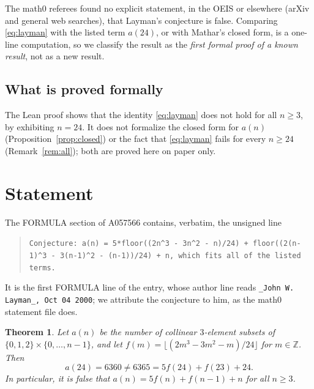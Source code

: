 \documentclass[11pt]{amsart}
\theoremstyle{plain}
\newtheorem{theorem}{Theorem}
\theoremstyle{definition}
\newcommand{\Z}{\mathbb{Z}}
\begin{document}
The math0 referees found no explicit statement, in the OEIS or elsewhere (arXiv and general web searches), that Layman's conjecture is false. Comparing \eqref{eq:layman} with the listed term $a(24)$, or with Mathar's closed form, is a one-line computation, so we classify the result as the \emph{first formal proof of a known result}, not as a new result.

\subsection*{What is proved formally}
The Lean proof shows that the identity \eqref{eq:layman} does not hold for all $n\ge3$, by exhibiting $n=24$. It does not formalize the closed form for $a(n)$ (Proposition~\ref{prop:closed}) or the fact that \eqref{eq:layman} fails for every $n\ge24$ (Remark~\ref{rem:all}); both are proved here on paper only.

\section{Statement}\label{sec:statement}

The FORMULA section of A057566 \cite{A057566} contains, verbatim, the unsigned line
\begin{quote}
{\small\raggedright\texttt{Conjecture: a(n) = 5*floor((2n\^{}3 - 3n\^{}2 - n)/24) + floor((2(n-1)\^{}3 - 3(n-1)\^{}2 - (n-1))/24) + n, which fits all of the listed terms.}\par}
\end{quote}
It is the first FORMULA line of the entry, whose author line reads \texttt{\_John W. Layman\_, Oct 04 2000}; we attribute the conjecture to him, as the math0 statement file does.

\begin{theorem}\label{thm:main}
Let $a(n)$ be the number of collinear $3$-element subsets of $\{0,1,2\}\times\{0,\dots,n-1\}$, and let $f(m)=\lfloor(2m^3-3m^2-m)/24\rfloor$ for $m\in\Z$. Then
\[
  a(24)=6360\ne 6365=5f(24)+f(23)+24 .
\]
In particular, it is false that $a(n)=5f(n)+f(n-1)+n$ for all $n\ge3$.
\end{theorem}
\end{document}
